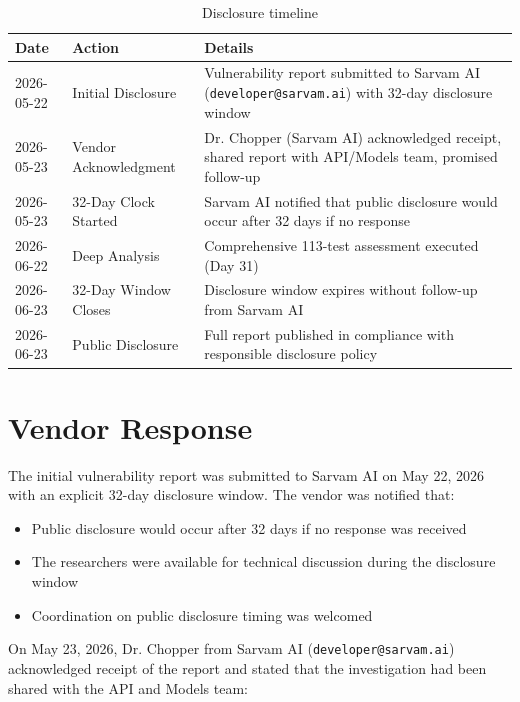 \documentclass[11pt,a4paper]{article}
\begin{document}
\begin{table}[H]
\centering
\begin{tabularx}{\textwidth}{|l|l|X|}
\hline
\textbf{Date} & \textbf{Action} & \textbf{Details} \\
\hline
2026-05-22 & Initial Disclosure & Vulnerability report submitted to Sarvam AI (\texttt{developer@sarvam.ai}) with 32-day disclosure window \\
\hline
2026-05-23 & Vendor Acknowledgment & Dr. Chopper (Sarvam AI) acknowledged receipt, shared report with API/Models team, promised follow-up \\
\hline
2026-05-23 & 32-Day Clock Started & Sarvam AI notified that public disclosure would occur after 32 days if no response \\
\hline
2026-06-22 & Deep Analysis & Comprehensive 113-test assessment executed (Day 31) \\
\hline
2026-06-23 & 32-Day Window Closes & Disclosure window expires without follow-up from Sarvam AI \\
\hline
2026-06-23 & Public Disclosure & Full report published in compliance with responsible disclosure policy \\
\hline
\end{tabularx}
\caption{Disclosure timeline}
\end{table}

\section{Vendor Response}

The initial vulnerability report was submitted to Sarvam AI on May 22, 2026 with an explicit 32-day disclosure window. The vendor was notified that:
\begin{itemize}[leftmargin=*]
    \item Public disclosure would occur after 32 days if no response was received
    \item The researchers were available for technical discussion during the disclosure window
    \item Coordination on public disclosure timing was welcomed
\end{itemize}

On May 23, 2026, Dr. Chopper from Sarvam AI (\texttt{developer@sarvam.ai}) acknowledged receipt of the report and stated that the investigation had been shared with the API and Models team:
\end{document}
